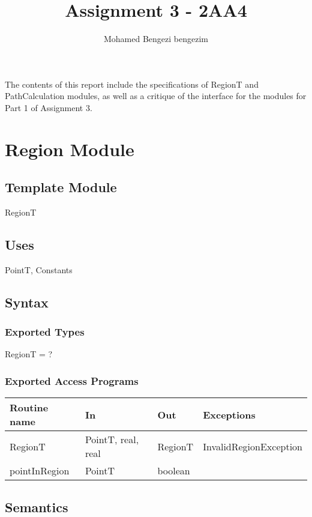 \documentclass[12pt]{article}
\title{Assignment 3 - 2AA4}
\author{Mohamed Bengezi bengezim}
\begin{document}
\maketitle
The contents of this report include the specifications of RegionT and PathCalculation modules, as
well as a critique of the interface for the modules for Part 1 of Assignment 3.



\section* {Region Module}

\subsection* {Template Module}

RegionT

\subsection* {Uses}

PointT, Constants

\subsection* {Syntax}

\subsubsection* {Exported Types}

RegionT = ?

\subsubsection* {Exported Access Programs}

\begin{tabular}{| l | l | l | l |}
\hline
\textbf{Routine name} & \textbf{In} & \textbf{Out} & \textbf{Exceptions}\\
\hline
RegionT & PointT, real, real & RegionT & InvalidRegionException\\
\hline
pointInRegion & PointT & boolean & ~\\
\hline 
\end{tabular}

\subsection* {Semantics}
\end{document}
